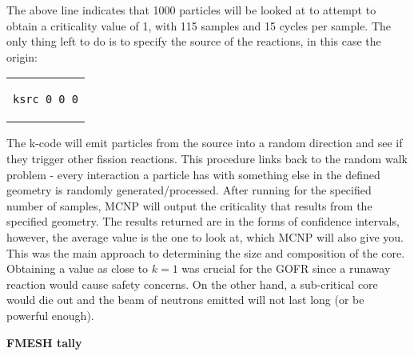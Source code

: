 The above line indicates that 1000 particles will be looked at to attempt to obtain a criticality value of 1, with 115 samples and 15 cycles per sample. The only thing left to do is to specify the source of the reactions, in this case the origin:

\begin{center}
\begin{tabular}{c}
\begin{lstlisting}
ksrc 0 0 0
\end{lstlisting}
\end{tabular}
\end{center}

The k-code will emit particles from the source into a random direction and see if they trigger other fission reactions. This procedure links back to the random walk problem - every interaction a particle has with something else in the defined geometry is randomly generated/processed. After running for the specified number of samples, MCNP will output the criticality that results from the specified geometry. The results returned are in the forms of confidence intervals, however, the average value is the one to look at, which MCNP will also give you. This was the main approach to determining the size and composition of the core. Obtaining a value as close to $k=1$ was crucial for the GOFR since a runaway reaction would cause safety concerns. On the other hand, a sub-critical core would die out and the beam of neutrons emitted will not last long (or be powerful enough).

\textbf{FMESH tally}\\
